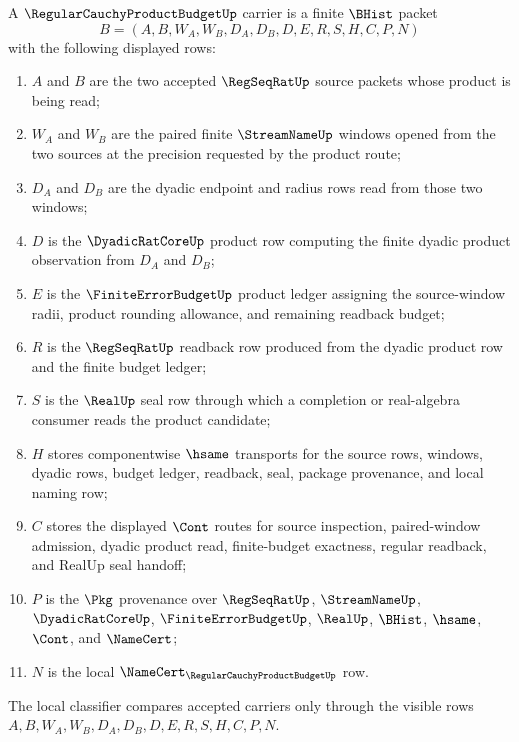 \begin{definition}
\label{def:regular-cauchy-product-budget-carrier}
A $\RegularCauchyProductBudgetUp$ carrier is a finite $\BHist$ packet
$$
B=(A,B,W_A,W_B,D_A,D_B,D,E,R,S,H,C,P,N)
$$
with the following displayed rows:
\begin{enumerate}
\item $A$ and $B$ are the two accepted $\RegSeqRatUp$ source packets whose product is being read;
\item $W_A$ and $W_B$ are the paired finite $\StreamNameUp$ windows opened from the two sources at the precision requested by the product route;
\item $D_A$ and $D_B$ are the dyadic endpoint and radius rows read from those two windows;
\item $D$ is the $\DyadicRatCoreUp$ product row computing the finite dyadic product observation from $D_A$ and $D_B$;
\item $E$ is the $\FiniteErrorBudgetUp$ product ledger assigning the source-window radii, product rounding allowance, and remaining readback budget;
\item $R$ is the $\RegSeqRatUp$ readback row produced from the dyadic product row and the finite budget ledger;
\item $S$ is the $\RealUp$ seal row through which a completion or real-algebra consumer reads the product candidate;
\item $H$ stores componentwise $\hsame$ transports for the source rows, windows, dyadic rows, budget ledger, readback, seal, package provenance, and local naming row;
\item $C$ stores the displayed $\Cont$ routes for source inspection, paired-window admission, dyadic product read, finite-budget exactness, regular readback, and RealUp seal handoff;
\item $P$ is the $\Pkg$ provenance over $\RegSeqRatUp$, $\StreamNameUp$, $\DyadicRatCoreUp$, $\FiniteErrorBudgetUp$, $\RealUp$, $\BHist$, $\hsame$, $\Cont$, and $\NameCert$;
\item $N$ is the local $\NameCert_{\RegularCauchyProductBudgetUp}$ row.
\end{enumerate}
The local classifier compares accepted carriers only through the visible rows $A,B,W_A,W_B,D_A,D_B,D,E,R,S,H,C,P,N$.
\end{definition}


